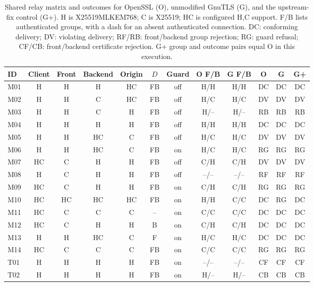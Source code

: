 \begin{table}[t]\centering\small
\caption{Shared relay matrix and outcomes for OpenSSL (O), unmodified GnuTLS (G), and the upstream-fix control (G+). H is X25519MLKEM768; C is X25519; HC is configured H,C support. F/B lists authenticated groups, with a dash for an absent authenticated connection. DC: conforming delivery; DV: violating delivery; RF/RB: front/backend group rejection; RG: guard refusal; CF/CB: front/backend certificate rejection. G+ group and outcome pairs equal O in this execution.}
\label{tab:matrix}
\begin{tabular}{@{}lccccccccccc@{}}\toprule
ID & Client & Front & Backend & Origin & $D$ & Guard & O F/B & G F/B & O & G & G+ \\ \midrule
M01 & H & H & H & HC & FB & off & H/H & H/H & DC & DC & DC \\
M02 & H & H & C & HC & FB & off & H/C & H/C & DV & DV & DV \\
M03 & H & H & C & H & FB & off & H/-- & H/-- & RB & RB & RB \\
M04 & H & H & H & H & FB & off & H/H & H/H & DC & DC & DC \\
M05 & H & H & HC & C & FB & off & H/C & H/C & DV & DV & DV \\
M06 & H & H & HC & C & FB & on & H/C & H/C & RG & RG & RG \\
M07 & HC & C & H & H & FB & off & C/H & C/H & DV & DV & DV \\
M08 & H & C & H & H & FB & off & --/-- & --/-- & RF & RF & RF \\
M09 & HC & C & H & H & FB & on & C/H & C/H & RG & RG & RG \\
M10 & HC & HC & HC & HC & FB & on & H/H & C/C & DC & RG & DC \\
M11 & HC & C & C & C & -- & on & C/C & C/C & DC & DC & DC \\
M12 & HC & C & H & H & B & on & C/H & C/H & DC & DC & DC \\
M13 & H & H & HC & C & F & on & H/C & H/C & DC & DC & DC \\
M14 & HC & C & C & C & FB & on & C/C & C/C & RG & RG & RG \\
T01 & H & H & H & H & FB & on & --/-- & --/-- & CF & CF & CF \\
T02 & H & H & H & H & FB & on & H/-- & H/-- & CB & CB & CB \\
\bottomrule\end{tabular}
\end{table}
